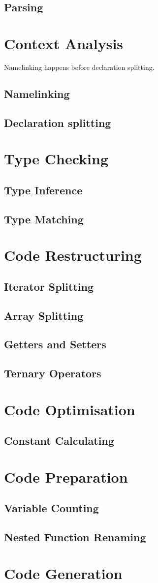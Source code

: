 \documentclass[a4paper,11pt]{report}
\begin{document}
\subsection{Parsing}

\section{Context Analysis}
Namelinking happens before declaration splitting.
\subsection{Namelinking}
\subsection{Declaration splitting}

\section{Type Checking}
\subsection{Type Inference}
\subsection{Type Matching}

\section{Code Restructuring}
\subsection{Iterator Splitting}
\subsection{Array Splitting}
\subsection{Getters and Setters}
\subsection{Ternary Operators}

\section{Code Optimisation}
\subsection{Constant Calculating}

\section{Code Preparation}
\subsection{Variable Counting}
\subsection{Nested Function Renaming}

\section{Code Generation}
\end{document}
